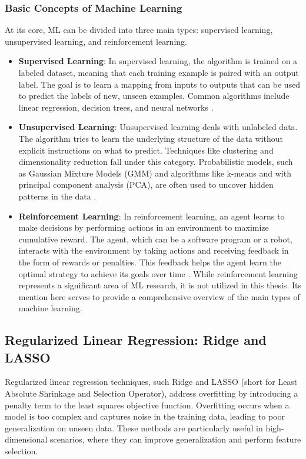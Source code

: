 \documentclass[english,11pt,a4paper,titlepage]{article}
\begin{document}
	\subsubsection*{Basic Concepts of Machine Learning}
	At its core, ML can be divided into three main types: supervised learning, unsupervised learning, and reinforcement learning.
	\begin{itemize}
		\item \textbf{Supervised Learning}: In supervised learning, the algorithm is trained on a labeled dataset, meaning that each training example is paired with an output label. The goal is to learn a mapping from inputs to outputs that can be used to predict the labels of new, unseen examples. Common algorithms include linear regression, decision trees, and neural networks \cite{jordanMachineLearningTrends2015}.
		\item \textbf{Unsupervised Learning}: Unsupervised learning deals with unlabeled data. The algorithm tries to learn the underlying structure of the data without explicit instructions on what to predict. Techniques like clustering and dimensionality reduction fall under this category. Probabilistic models, such as Gaussian Mixture Models (GMM) and algorithms like k-means and with principal component analysis (PCA), are often used to uncover hidden patterns in the data \cite{ghahramaniProbabilisticMachineLearning2015}.
		\item \textbf{Reinforcement Learning}: In reinforcement learning, an agent learns to make decisions by performing actions in an environment to maximize cumulative reward. The agent, which can be a software program or a robot, interacts with the environment by taking actions and receiving feedback in the form of rewards or penalties. This feedback helps the agent learn the optimal strategy to achieve its goals over time \cite{suttonReinforcementLearningIntroduction}. While reinforcement learning represents a significant area of ML research, it is not utilized in this thesis. Its mention here serves to provide a comprehensive overview of the main types of machine learning.
	\end{itemize}
	
	\subsection*{Regularized Linear Regression: Ridge and LASSO}
	Regularized linear regression techniques, such Ridge and LASSO (short for Least Absolute Shrinkage and Selection Operator), address overfitting by introducing a penalty term to the least squares objective function. Overfitting occurs when a model is too complex and captures noise in the training data, leading to poor generalization on unseen data. These methods are particularly useful in high-dimensional scenarios, where they can improve generalization and perform feature selection.
	
\end{document}
